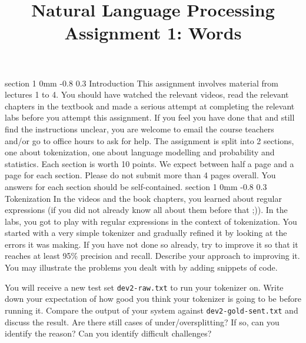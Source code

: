 \documentclass[11pt]{article}
\title{{\LARGE Natural Language Processing}\\[1.5mm]{\large Assignment 1: Words}}
\author{}
\date{} %
\makeatletter
\renewcommand{\section}{\@startsection
{section}%
{1}%
{0mm}%
{-0.8\baselineskip}%
{0.3\baselineskip}%
{\bfseries\large}}%
\makeatother
\begin{document}
 

\maketitle
\section{Introduction}
\indent This assignment involves material from lectures 1 to 4. You should have
watched the relevant videos, read the relevant chapters in the textbook and
made a serious attempt at completing the relevant labs before you attempt this
assignment.
If you feel you have done that and still find the instructions unclear, you are
welcome to email the course teachers and/or go to office hours to ask for
help.
The assignment is split into 2 sections, one about tokenization, one about
language modelling and probability and statistics. Each section is worth 10
points. We expect between half a page and a page for each section. Please do
not submit more than 4 pages overall. 
You answers for each section should be self-contained.
\section{Tokenization}
In the videos and the book chapters, you learned about regular expressions (if
you did not already know all about them before that ;)). In the labs, you got
to play with regular expressions in the context of tokenization.
You started with a very simple tokenizer and gradually refined it by looking at
the errors it was making. 
If you have not done so already, try to improve it so that it reaches at least
95\% precision and recall.  
Describe your approach to improving it. You may illustrate the problems you
dealt with by adding snippets of code.

You will receive a new test set {\tt dev2-raw.txt} to run your tokenizer on.  
Write down your expectation of how good you think your tokenizer is going to be
before running it.  
Compare the output of your system against {\tt dev2-gold-sent.txt} and discuss
the result. Are there still cases of under/oversplitting? If so, can you
identify the reason? Can you identify difficult challenges?
\end{document}

